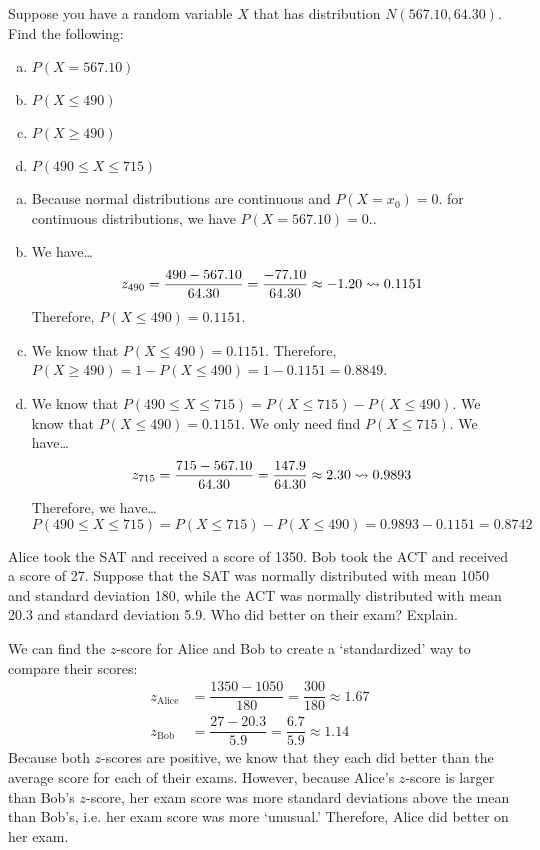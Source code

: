 \documentclass[11pt,letterpaper]{article}
\begin{document}

 Suppose you have a random variable $X$ that has distribution $N(567.10, 64.30)$. Find the following:
	\begin{enumerate}[(a)]
	\item $P(X= 567.10)$
	\item $P(X \leq 490)$
	\item $P(X \geq 490)$
	\item $P(490 \leq X \leq 715)$
	\end{enumerate} \pspace

\sol 
\begin{enumerate}[(a)]
\item Because normal distributions are continuous and $P(X= x_0)= 0.$ for continuous distributions, we have $P(X= 567.10)= 0.$. \pspace

\item We have\dots
	\[
	z_{490}= \dfrac{490 - 567.10}{64.30}= \dfrac{-77.10}{64.30} \approx -1.20 \rightsquigarrow 0.1151
	\]
Therefore, $P(X \leq 490)= 0.1151$. \pspace

\item We know that $P(X \leq 490)= 0.1151$. Therefore, $P(X \geq 490)= 1 - P(X \leq 490)= 1 - 0.1151= 0.8849$. \pspace

\item We know that $P(490 \leq X \leq 715)= P(X \leq 715) - P(X \leq 490)$. We know that $P(X \leq 490)= 0.1151$. We only need find $P(X \leq 715)$. We have\dots
	\[
	z_{715}= \dfrac{715 - 567.10}{64.30}= \dfrac{147.9}{64.30} \approx 2.30 \rightsquigarrow 0.9893
	\]
Therefore, we have\dots
	\[
	P(490 \leq X \leq 715)= P(X \leq 715) - P(X \leq 490)= 0.9893 - 0.1151= 0.8742
	\]
\end{enumerate}



\newpage



 Alice took the SAT and received a score of 1350. Bob took the ACT and received a score of 27. Suppose that the SAT was normally distributed with mean 1050 and standard deviation 180, while the ACT was normally distributed with mean 20.3 and standard deviation 5.9. Who did better on their exam? Explain. \pspace

\sol We can find the $z$-score for Alice and Bob to create a `standardized' way to compare their scores: 
	\[
	\begin{aligned}
	z_{\text{Alice}}&= \dfrac{1350 - 1050}{180}= \dfrac{300}{180} \approx 1.67 \\[0.3cm]
	z_{\text{Bob}}&= \dfrac{27 - 20.3}{5.9}= \dfrac{6.7}{5.9} \approx 1.14
	\end{aligned}
	\] \pspace
Because both $z$-scores are positive, we know that they each did better than the average score for each of their exams. However, because Alice's $z$-score is larger than Bob's $z$-score, her exam score was more standard deviations above the mean than Bob's, i.e. her exam score was more `unusual.' Therefore, Alice did better on her exam. 
\end{document}
